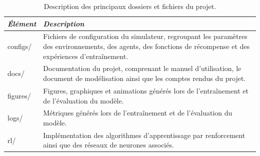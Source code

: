 \begin{table}[h]
    \centering
    \caption{Description des principaux dossiers et fichiers du projet.}
    \label{tab:project_structure}
    \begin{tabularx}{\textwidth}{>{\ttfamily\small}l X}
        \toprule
        \textnormal{\textit{Élément}} & \textit{Description}                                                                                                                                                                                                                                                                                                              \\
        \midrule
        configs/                      & Fichiers de configuration du simulateur, regroupant les paramètres des environnements, des agents, des fonctions de récompense et des expériences d'entraînement.                                                                                                                                                                 \\

        docs/                         & Documentation du projet, comprenant le manuel d'utilisation, le document de modélisation ainsi que les comptes rendus du projet.                                                                                                                                                                                                  \\

        figures/                      & Figures, graphiques et animations générés lors de l'entraînement et de l'évaluation du modèle.                                                                                                                                                                                                                                    \\

        logs/                         & Métriques générés lors de l'entraînement et de l'évaluation du modèle.                                                                                                                                                                                                                                                            \\

        rl/                           & Implémentation des algorithmes d'apprentissage par renforcement ainsi que des réseaux de neurones associés.                                                                                                                                                                                                                       \\


\end{tabularx}
\end{table}
